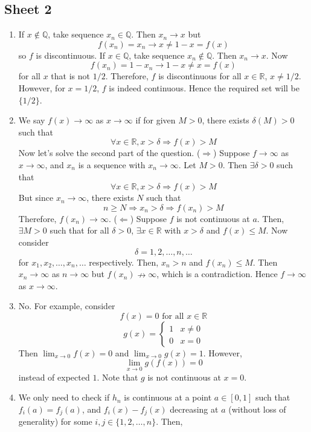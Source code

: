 \documentclass[10pt, a4paper, twoside]{report}
\begin{document}
\subsection{Sheet 2}
\begin{enumerate}[{1.}]
    \item If \(x\notin\mathbb{Q}\), take sequence \(x_n\in\mathbb{Q}\). Then \(x_n\to x\) but \[f(x_n)=x_n\to x\neq 1-x=f(x)\] so \(f\) is discontinuous. If \(x\in\mathbb{Q}\), take sequence \(x_n\notin\mathbb{Q}\). Then \(x_n\to x\). Now \[f(x_n)=1-x_n\to 1-x\neq x=f(x)\] for all \(x\) that is not \(1/2\). Therefore, \(f\) is discontinuous for all \(x\in\mathbb{R}\), \(x\neq 1/2\). However, for \(x=1/2\), \(f\) is indeed continuous. Hence the required set will be \(\{1/2\}\).
    \item We say \(f(x)\to\infty\) as \(x\to\infty\) if for given \(M>0\), there exists \(\delta(M)>0\) such that 
    \[\forall x\in\mathbb{R}, x>\delta\Rightarrow f(x)>M\]
    Now let's solve the second part of the question. \newline 
    (\(\Rightarrow\)) Suppose \(f\to\infty\) as \(x\to\infty\), and \(x_n\) is a sequence with \(x_n\to\infty\). Let \(M>0\). Then \(\exists\delta>0\) such that 
    \[\forall x\in\mathbb{R},x>\delta\Rightarrow f(x)>M\]
    But since \(x_n\to\infty\), there exists \(N\) such that 
    \[n\geq N\Rightarrow x_n>\delta\Rightarrow f(x_n)>M\]
    Therefore, \(f(x_n)\to\infty\). \newline 
    (\(\Leftarrow\)) Suppose \(f\) is not continuous at \(a\). Then, \(\exists M>0\) such that for all \(\delta>0\), \(\exists x\in\mathbb{R}\) with \(x>\delta\) and \(f(x)\leq M\). Now consider 
    \[\delta=1,2,\ldots,n,\ldots\]
    for \(x_1,x_2,\ldots,x_n,\ldots\) respectively. Then, \(x_n>n\) and \(f(x_n)\leq M\). Then \(x_n\to\infty\) as \(n\to\infty\) but \(f(x_n)\nrightarrow\infty\), which is a contradiction. Hence \(f\to\infty\) as \(x\to\infty\).
    \item No. For example, consider 
    \[f(x)=0\text{  for all }x\in\mathbb{R}\]
    \[g(x)=\begin{cases}
        1 & x\neq 0 \\
        0 & x=0
    \end{cases}\]
    Then \(\lim_{x\to 0}f(x)=0\) and \(\lim_{x\to 0}g(x)=1\). However, 
    \[\lim_{x\to 0}g(f(x))=0\]
    instead of expected \(1\). Note that \(g\) is not continuous at \(x=0\).
    \item We only need to check if \(h_n\) is continuous at a point \(a\in[0,1]\) such that \(f_i(a)=f_j(a)\), and \(f_i(x)-f_j(x)\) decreasing at \(a\) (without loss of generality) for some \(i,j\in\{1,2,\ldots,n\}\). Then,

\end{enumerate}
\end{document}
